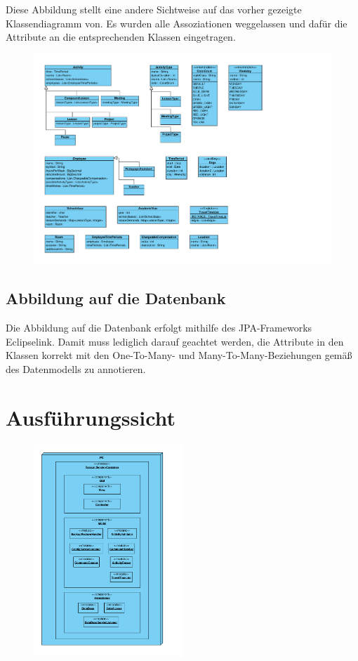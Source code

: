 \documentclass[fontsize=12pt,paper=a4,twoside]{scrartcl}
\begin{document}
Diese Abbildung stellt eine andere Sichtweise auf das vorher gezeigte Klassendiagramm von. Es wurden alle Assoziationen weggelassen und dafür die Attribute an die entsprechenden Klassen eingetragen.
\begin{figure}[H]
\includegraphics[width=\textwidth]{datensicht.pdf}
\end{figure}


\subsection{Abbildung auf die Datenbank}
Die Abbildung auf die Datenbank erfolgt mithilfe des JPA-Frameworks Eclipselink. Damit muss lediglich darauf geachtet werden, die Attribute in den Klassen korrekt mit den One-To-Many- und Many-To-Many-Beziehungen gemäß des Datenmodells zu annotieren.\\

\clearpage


\section{Ausführungssicht}
\label{sec:ausfuehrung}

\begin{figure}[H]
\centering
\includegraphics[width=0.5\textwidth]{ausfuehrung.pdf}
\end{figure}
\end{document}
